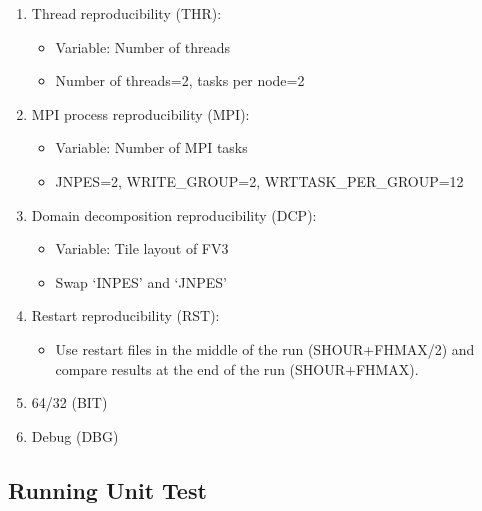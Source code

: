 \documentclass[11pt,fleqn]{report}              %
\begin{document}
\begin{enumerate}
\item Thread reproducibility (THR):
\begin{itemize}
\item Variable: Number of threads
\item Number of threads=2, tasks per node=2
\end{itemize}
\item MPI process reproducibility (MPI):
\begin{itemize}
\item Variable: Number of MPI tasks
\item JNPES=2, WRITE\_GROUP=2, WRTTASK\_PER\_GROUP=12
\end{itemize}
\item Domain decomposition reproducibility (DCP):
\begin{itemize}
\item Variable: Tile layout of FV3
\item Swap `INPES' and `JNPES'
\end{itemize}
\item Restart reproducibility (RST):
\begin{itemize}
\item Use restart files in the middle of the run (SHOUR+FHMAX/2) and compare results at the end of the run (SHOUR+FHMAX).
\end{itemize}
\item 64/32 (BIT)
\item Debug (DBG)
\end{enumerate}


\subsection{Running Unit Test}
\end{document}

